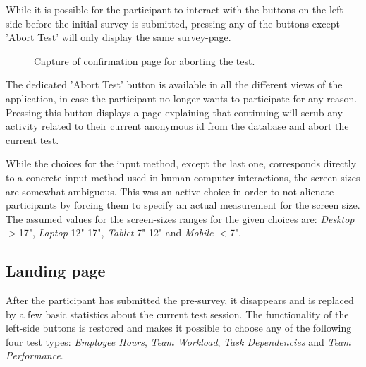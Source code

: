 {  While it is possible for the participant to interact with the buttons on
  the left side before the initial survey is submitted, pressing any of the
  buttons except 'Abort Test' will only display the same survey-page.

  \begin{figure}[h!]
    \centering
    \caption{Capture of confirmation page for aborting the test.}
    \label{label_abort}
  \end{figure}

  The dedicated 'Abort Test' button is available in all the different
  views of the application, in case the participant no longer wants to
  participate for any reason. Pressing this button displays a page
  explaining that continuing will scrub any activity related to their
  current anonymous id from the database and abort the current test.

  While the choices for the input method, except the last one, corresponds
  directly to a concrete input method used in human-computer interactions, the
  screen-sizes are somewhat ambiguous. This was an active choice in order to
  not alienate participants by forcing them to specify an actual measurement
  for the screen size. The assumed values for the screen-sizes ranges for the
  given choices are:
  \textit{Desktop} $>$17",
  \textit{Laptop}  12"-17",
  \textit{Tablet}  7"-12" and
  \textit{Mobile}  $<$7".

  \subsection{Landing page}

  After the participant has submitted the pre-survey, it  disappears and is
  replaced by a few basic statistics about the current test session.
  The functionality of the left-side buttons is restored and makes it
  possible to choose any of the following four test types:
  \textit{Employee Hours},
  \textit{Team Workload},
  \textit{Task Dependencies} and
  \textit{Team Performance}.

}
